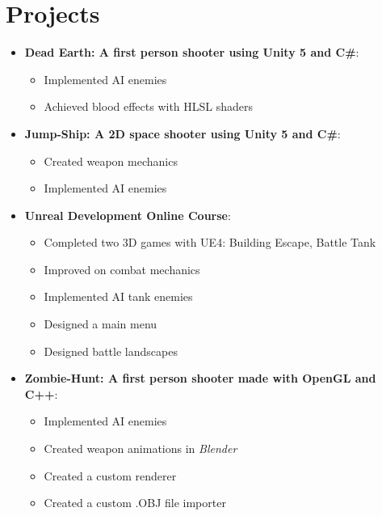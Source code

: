 \documentclass[letterpaper,11pt]{article}
\newcommand{\resumeItem}[2]{
	\item\small{
		\textbf{#1}{: #2 \vspace{-2pt}}
	}
}
\newcommand{\resumeSubItem}[2]{\resumeItem{#1}{#2}\vspace{-4pt}}
\newcommand{\resumeSubHeadingListStart}{\begin{itemize}[leftmargin=*]}
\newcommand{\resumeSubHeadingListEnd}{\end{itemize}}
\begin{document}
	\section{Projects}
	\resumeSubHeadingListStart
	\resumeSubItem{Dead Earth: A first person shooter using Unity 5 and C\#}{}
	\begin{multicols}{2}
		\begin{itemize}
			\setlength\itemsep{0em}
			\item Implemented AI enemies
			\item Achieved blood effects with HLSL shaders
		\end{itemize}	
	\end{multicols}
	\vspace*{-5mm}
	\resumeSubItem{Jump-Ship: A 2D space shooter using Unity 5 and C\#}{}
	\begin{multicols}{2}
		\begin{itemize}
			\setlength\itemsep{0em}
			\item Created weapon mechanics
			\item Implemented AI enemies
		\end{itemize}
	\end{multicols}
	\vspace*{-5mm}
	\resumeSubItem{Unreal Development Online Course}{}
	\begin{multicols}{2}
		\begin{itemize}
			\setlength\itemsep{0em}
			\item Completed two 3D games with UE4: Building Escape, Battle Tank
			\item Improved on combat mechanics
			\item Implemented AI tank enemies
			\item Designed a main menu
			\item Designed battle landscapes
			
		\end{itemize}
	\end{multicols}
	\vspace*{-5mm}
	\resumeSubItem{Zombie-Hunt: A first person shooter made with OpenGL and C++}{}
	\begin{multicols}{2}
		\begin{itemize}
			\setlength\itemsep{0em}
			\item Implemented AI enemies
			\item Created weapon animations in \textit{Blender}
			\item Created a custom renderer
			\item Created a custom .OBJ file importer
		\end{itemize}
	\end{multicols}
	\resumeSubHeadingListEnd
	
\end{document}
